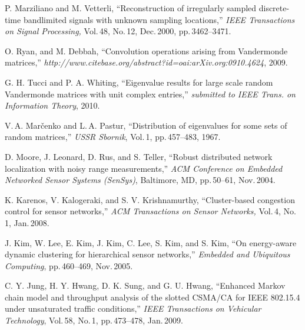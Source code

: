 \documentclass[11pt, draftcls, onecolumn, a4paper]{IEEEtran}
\begin{document}
\begin{thebibliography}{99}
 P. Marziliano and M. Vetterli, ``Reconstruction of 
irregularly sampled discrete-time
bandlimited signals with unknown sampling locations,'' {\em IEEE 
Transactions on Signal Processing,}
Vol.\,48, No.\,12, Dec.\,2000, pp.\,3462--3471.

  O. Ryan, and  M. Debbah,
  ``Convolution operations arising from Vandermonde matrices,''
  {\em http://www.citebase.org/abstract?id=oai:arXiv.org:0910.4624},
  2009.

 G. H. Tucci and P. A. Whiting,
  ``Eigenvalue results for large scale random Vandermonde matrices
  with unit complex entries,'' {\em submitted to IEEE Trans. on Information
  Theory}, 2010.

V.\,A. Mar\v{c}enko and L.\,A. Pastur, ``Distribution of eigenvalues for
some sets of random
matrices,'' {\it USSR Sbornik}, Vol.\,1, pp.\,457--483, 1967.

D. Moore, J. Leonard, D. Rus, and S. Teller,
``Robust distributed network localization with noisy range measurements,''
 {\em ACM Conference on Embedded Networked Sensor Systems (SenSys)},
 Baltimore, MD, pp.\,50--61, Nov.\,2004.

 K. Karenos, V. Kalogeraki, and S. V. Krishnamurthy,
``Cluster-based congestion control for sensor networks,'' 
{\em ACM Transactions on Sensor Networks,}  	 
Vol.\,4, No.\,1, Jan.\,2008.


 J. Kim, W. Lee, E. Kim, J. Kim, C. Lee, 
S. Kim, and S. Kim,
``On energy-aware dynamic clustering for hierarchical sensor networks,''
{\em  Embedded and Ubiquitous Computing}, pp.\,460--469, Nov.\,2005.

C. Y. Jung, H. Y. Hwang, D. K. Sung, and G. U. Hwang, 
``Enhanced Markov chain model and throughput analysis
of the slotted CSMA/CA for IEEE 802.15.4 under
unsaturated traffic conditions,'' {\em IEEE Transactions on Vehicular 
Technology}, Vol.\,58, No.\,1, pp.\,473--478, Jan.\,2009.

\end{thebibliography}
\end{document}

